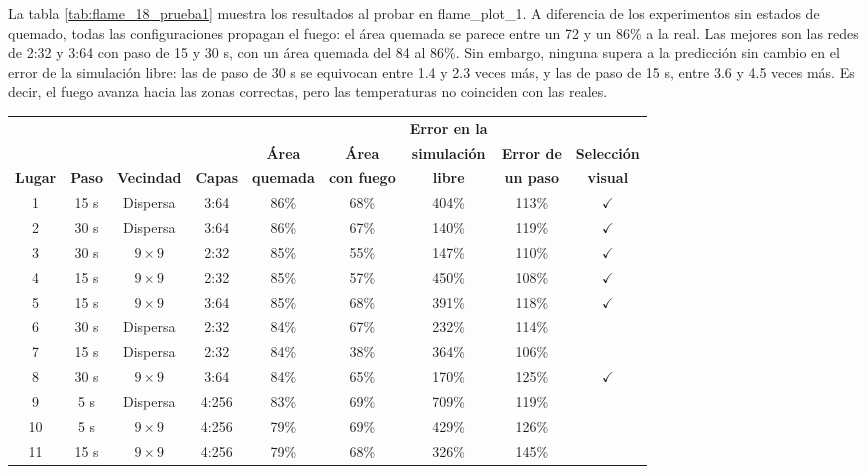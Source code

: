 	La tabla \ref{tab:flame_18_prueba1} muestra los resultados al probar en flame\_plot\_1. A diferencia de los experimentos sin estados de quemado, todas las configuraciones propagan el fuego: el área quemada se parece entre un 72 y un 86\% a la real. Las mejores son las redes de 2:32 y 3:64 con paso de 15 y 30 s, con un área quemada del 84 al 86\%. Sin embargo, ninguna supera a la predicción sin cambio en el error de la simulación libre: las de paso de 30 s se equivocan entre 1.4 y 2.3 veces más, y las de paso de 15 s, entre 3.6 y 4.5 veces más. Es decir, el fuego avanza hacia las zonas correctas, pero las temperaturas no coinciden con las reales.

	\begin{table}[htbp]
		\centering
		\footnotesize
		\setlength{\tabcolsep}{3pt}
		\begin{tabular}{@{}ccccccccc@{}}
			\toprule
			& & & & & & \textbf{Error en la} & & \\
			& & & & \textbf{Área} & \textbf{Área} & \textbf{simulación} & \textbf{Error de} & \textbf{Selección} \\
			\textbf{Lugar} & \textbf{Paso} & \textbf{Vecindad} & \textbf{Capas} & \textbf{quemada} & \textbf{con fuego} & \textbf{libre} & \textbf{un paso} & \textbf{visual} \\ \midrule
			1 & 15 s & Dispersa & 3:64 & 86\% & 68\% & 404\% & 113\% & $\checkmark$ \\
			2 & 30 s & Dispersa & 3:64 & 86\% & 67\% & 140\% & 119\% & $\checkmark$ \\
			3 & 30 s & $9 \times 9$ & 2:32 & 85\% & 55\% & 147\% & 110\% & $\checkmark$ \\
			4 & 15 s & $9 \times 9$ & 2:32 & 85\% & 57\% & 450\% & 108\% & $\checkmark$ \\
			5 & 15 s & $9 \times 9$ & 3:64 & 85\% & 68\% & 391\% & 118\% & $\checkmark$ \\
			6 & 30 s & Dispersa & 2:32 & 84\% & 67\% & 232\% & 114\% &  \\
			7 & 15 s & Dispersa & 2:32 & 84\% & 38\% & 364\% & 106\% &  \\
			8 & 30 s & $9 \times 9$ & 3:64 & 84\% & 65\% & 170\% & 125\% & $\checkmark$ \\
			9 & 5 s & Dispersa & 4:256 & 83\% & 69\% & 709\% & 119\% &  \\
			10 & 5 s & $9 \times 9$ & 4:256 & 79\% & 69\% & 429\% & 126\% &  \\
			11 & 15 s & $9 \times 9$ & 4:256 & 79\% & 68\% & 326\% & 145\% &  \\

\end{tabular}
\end{table}
